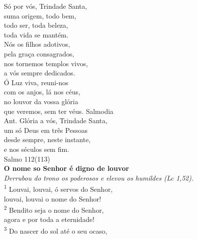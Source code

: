 \documentclass{book}
\begin{document}
\begin{center}
    Só por vós, Trindade Santa, \\
    suma origem, todo bem, \\
    todo ser, toda beleza, \\
    toda vida se mantém.
    \vspace{.2cm} \\
    Nós os filhos adotivos, \\
    pela graça consagrados, \\
    nos tornemos templos vivos, \\
    a vós sempre dedicados.
    \vspace{.2cm} \\
    Ó Luz viva, reuni-nos \\
    com os anjos, lá nos céus, \\
    no louvor da vossa glória \\
    que veremos, sem ter véus.
    \newpage
    \textcolor{VioletRed2}{Salmodia}
    \vspace{.2cm} \\
    \textcolor{VioletRed2}{Ant.} Glória a vós, Trindade Santa, \\
    um só Deus em três Pessoas \\
    desde sempre, neste instante, \\
    e nos séculos sem fim.
    \vspace{.2cm} \\
    \textcolor{VioletRed2}{Salmo 112(113)}
    \vspace{.2cm} \\
    \textbf{O nome so Senhor é digno de louvor} \\
    \textit{Derrubou do trono os poderosos e elevou os humildes (Lc 1,52).}
    \vspace{.2cm} \\
    \textsuperscript{\underline{\hspace{.07in}}\textcolor{VioletRed2}{1}} Louvai, louvai, ó servos do Senhor, \textsuperscript{\gresixstar{}} \\
    louvai, louvai o nome do Senhor! \\
    \textsuperscript{\underline{\hspace{.07in}}\textcolor{VioletRed2}{2}} Bendito seja o nome do Senhor, \textsuperscript{\gresixstar{}} \\
    agora e por toda a eternidade! \\
    \textsuperscript{\underline{\hspace{.07in}}\textcolor{VioletRed2}{3}} Do nascer do sol até o seu ocaso, \textsuperscript{\gresixstar{}} \\

\end{center}
\end{document}
